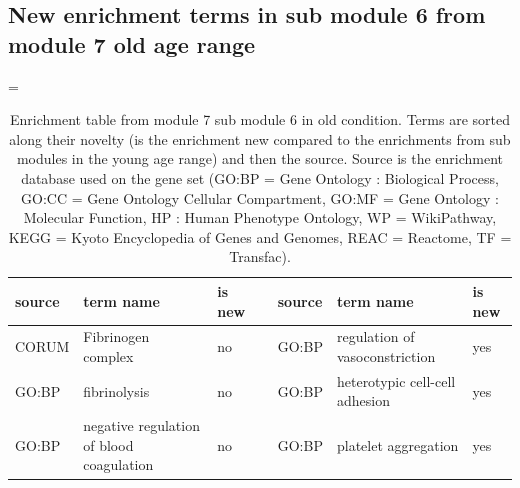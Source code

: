 \clearpage
\subsection{New enrichment terms in sub module 6 from module 7 old age range}
\label{supp:supp_sub_cluster_6_enrich_table}

\LTcapwidth=\textwidth
\begin{longtable}{@{}lp{5cm}lllp{5cm}l@{}}
\caption[Enrichment table from module 7 sub module 6 in old condition]{Enrichment table from module 7 sub module 6 in old condition. Terms are sorted along their novelty (is the enrichment new compared to the enrichments from sub modules in the young age range) and then the source. Source is the enrichment database used on the gene set (GO:BP = Gene Ontology : Biological Process, GO:CC = Gene Ontology Cellular Compartment, GO:MF = Gene Ontology : Molecular Function, HP : Human Phenotype Ontology, WP = WikiPathway, KEGG = Kyoto Encyclopedia of Genes and Genomes, REAC = Reactome, TF = Transfac).}
\\ \hline
\textbf{source} & \textbf{term name}                                                                                                                & \textbf{is new} & \textbf{} & \textbf{source} & \textbf{term name}                                                                                                                                                    & \textbf{is new} \\ \hline
CORUM           & Fibrinogen complex                                                                                                                 & no               &           & GO:BP           & regulation of vasoconstriction                                                                                                                                         & yes              \\
GO:BP           & fibrinolysis                                                                                                                       & no               &           & GO:BP           & heterotypic cell-cell adhesion                                                                                                                                         & yes              \\
GO:BP           & negative regulation of blood coagulation                                                                                           & no               &           & GO:BP           & platelet aggregation                                                                                                                                                   & yes              \\

\end{longtable}
